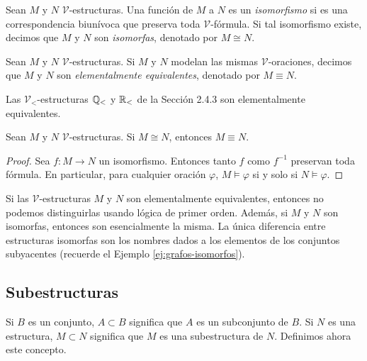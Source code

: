 \documentclass[12pt,a4paper]{book}
\newcommand{\VV}{\mathcal{V}}
\begin{document}
    \begin{definicion}[Isomorfismo]\label{def:isomorfismo-estructuras}
        Sean $M$ y $N$ $\VV$-estructuras. Una función de $M$ a $N$ es un \textit{isomorfismo} si es una correspondencia
        biunívoca que preserva toda $\VV$-fórmula. Si tal isomorfismo existe, decimos que $M$ y $N$ son \textit{isomorfas},
        denotado por $M\cong N$.
    \end{definicion}

    \begin{definicion}\label{def:equivalencia-elemental}
        Sean $M$ y $N$ $\VV$-estructuras. Si $M$ y $N$ modelan las mismas $\VV$-oraciones, decimos que $M$ y $N$ son
        \textit{elementalmente equivalentes}, denotado por $M\equiv N$.
    \end{definicion}

    \begin{ejemplo}
        Las $\VV_{<}$-estructuras $\mathbb{Q}_{<}$ y $\mathbb{R}_{<}$ de la Sección 2.4.3 son elementalmente equivalentes.
    \end{ejemplo}

    \begin{proposicion}\label{prop:isomorfo-implica-equivalente}
        Sean $M$ y $N$ $\VV$-estructuras. Si $M\cong N$, entonces $M\equiv N$.
    \end{proposicion}
    \begin{proof}
        Sea $f:M\rightarrow N$ un isomorfismo. Entonces tanto $f$ como $f^{-1}$ preservan toda fórmula. En particular, para
        cualquier oración $\varphi$, $M\models\varphi$ si y solo si $N\models\varphi$.
    \end{proof}

    Si las $\VV$-estructuras $M$ y $N$ son elementalmente equivalentes, entonces no podemos distinguirlas usando lógica de
    primer orden. Además, si $M$ y $N$ son isomorfas, entonces son esencialmente la misma. La única diferencia entre
    estructuras isomorfas son los nombres dados a los elementos de los conjuntos subyacentes (recuerde el Ejemplo
    \ref{ej:grafos-isomorfos}).

    \subsection{Subestructuras}

    Si $B$ es un conjunto, $A\subset B$ significa que $A$ es un subconjunto de $B$. Si $N$ es una estructura, $M\subset N$
    significa que $M$ es una subestructura de $N$. Definimos ahora este concepto.
\end{document}
